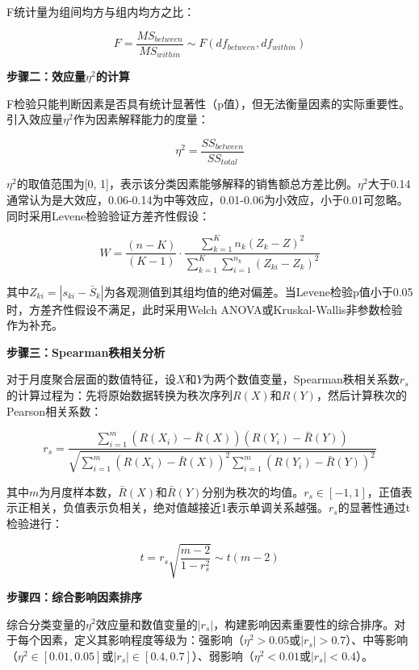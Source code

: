 F统计量为组间均方与组内均方之比：

\begin{equation}
F = \frac{MS_{between}}{MS_{within}} \sim F(df_{between}, df_{within})
\end{equation}

\textbf{步骤二：效应量$\eta^2$的计算}

F检验只能判断因素是否具有统计显著性（p值），但无法衡量因素的实际重要性。引入效应量$\eta^2$作为因素解释能力的度量：

\begin{equation}
\eta^2 = \frac{SS_{between}}{SS_{total}}
\end{equation}

$\eta^2$的取值范围为[0, 1]，表示该分类因素能够解释的销售额总方差比例。$\eta^2$大于0.14通常认为是大效应，0.06-0.14为中等效应，0.01-0.06为小效应，小于0.01可忽略。同时采用Levene检验验证方差齐性假设：

\begin{equation}
W = \frac{(n-K)}{(K-1)} \cdot \frac{\sum_{k=1}^{K} n_k (Z_k - Z)^2}{\sum_{k=1}^{K} \sum_{i=1}^{n_k} (Z_{ki} - Z_k)^2}
\end{equation}

其中$Z_{ki} = |s_{ki} - \bar{S}_k|$为各观测值到其组均值的绝对偏差。当Levene检验p值小于0.05时，方差齐性假设不满足，此时采用Welch ANOVA或Kruskal-Wallis非参数检验作为补充。

\textbf{步骤三：Spearman秩相关分析}

对于月度聚合层面的数值特征，设$X$和$Y$为两个数值变量，Spearman秩相关系数$r_s$的计算过程为：先将原始数据转换为秩次序列$R(X)$和$R(Y)$，然后计算秩次的Pearson相关系数：

\begin{equation}
r_s = \frac{\sum_{i=1}^{m} (R(X_i) - \bar{R}(X))(R(Y_i) - \bar{R}(Y))}{\sqrt{\sum_{i=1}^{m} (R(X_i) - \bar{R}(X))^2 \sum_{i=1}^{m} (R(Y_i) - \bar{R}(Y))^2}}
\end{equation}

其中$m$为月度样本数，$\bar{R}(X)$和$\bar{R}(Y)$分别为秩次的均值。$r_s \in [-1, 1]$，正值表示正相关，负值表示负相关，绝对值越接近1表示单调关系越强。$r_s$的显著性通过t检验进行：

\begin{equation}
t = r_s \sqrt{\frac{m-2}{1-r_s^2}} \sim t(m-2)
\end{equation}

\textbf{步骤四：综合影响因素排序}

综合分类变量的$\eta^2$效应量和数值变量的$|r_s|$，构建影响因素重要性的综合排序。对于每个因素，定义其影响程度等级为：强影响（$\eta^2 > 0.05$或$|r_s| > 0.7$）、中等影响（$\eta^2 \in [0.01, 0.05]$或$|r_s| \in [0.4, 0.7]$）、弱影响（$\eta^2 < 0.01$或$|r_s| < 0.4$）。

